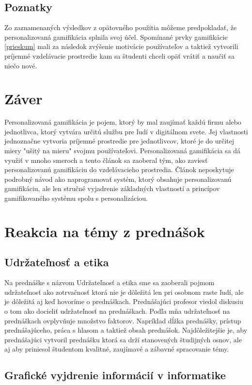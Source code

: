 \documentclass[10pt,twoside,slovak,a4paper]{article}
\begin{document}
\subsection{Poznatky}
Zo zaznamenaných výsledkov z opätovného použitia môžeme predpokladať, že personalizovaná gamifikácia splnila svoj účel. Spomínané prvky gamifikácie \ref{prieskum} mali za následok zvýšenie motivácie používateľov a taktiež vytvorili príjemné vzdelávacie prostredie kam sa študenti chceli opäť vrátiť a naučiť sa niečo nové.

\section{Záver}

Personalizovaná gamifikácia je pojem, ktorý by mal zaujímať každú firmu alebo jednotlivca, ktorý vytvára určitú službu pre ľudí v digitálnom svete. Jej vlastnosti jednoznačne vytvoria príjemné prostredie pre jednotlivcov, ktoré je do určitej miery "ušitý na mieru" svojmu používateľovi. Personalizovaná gamifikácia sa dá využiť v mnoho smeroch a tento článok sa zaoberal tým, ako zaviesť personalizovanú gamifikáciu do vzdelávacieho prostredia. Článok neposkytuje podrobný návod ako naprogramovať systém, ktorý obsahuje personalizovanú gamifikáciu, ale len stručné vyjadrenie základných vlastností a princípov gamifikovaného systému spolu s personalizáciou.

\section{Reakcia na témy z prednášok}

\subsection{Udržateľnosť a etika}

Na prednáške s názvom Udržateľnosť a etika sme sa zaoberali pojmom udržateľnosť ako zotrvačnosť ktorá nie je dôležitá len pri osobnom raste ľudí, ale je dôležitá aj keď hovoríme o prednáškach. Prednášajúci profesor viedol diskusiu o tom ako docieliť udržateľnosť na prednáškach. Podľa mňa udržateľnosť na prednáškach ovplyvňuje množstvo faktorov. Napríklad dĺžka prednášky, prístup prednášajúceho, práca s hlasom a taktiež obsah prednášok. Najdôležitejšie je, aby prednášajúci vytvoril prednášku ktorá sa drží stanovených študijných osnov, ale aj aby priniesol študentom kvalitné, zaujímavé a zábavné spracovanie témy.

\subsection{Grafické vyjdrenie informácií v informatike}
\end{document}
